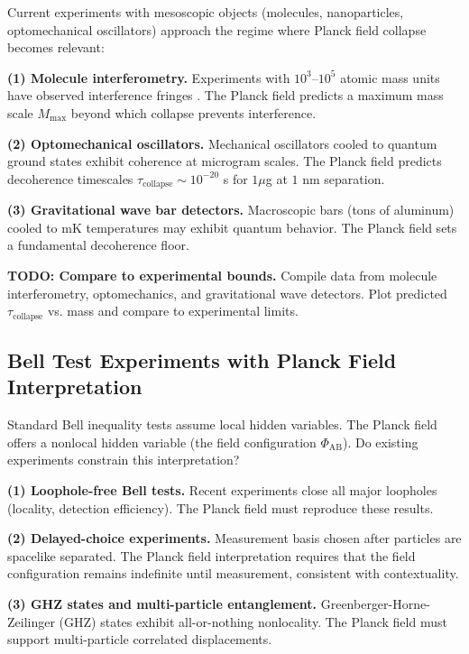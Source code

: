 \documentclass[11pt,a4paper]{article}
\theoremstyle{definition}
\theoremstyle{remark}
\begin{document}
Current experiments with mesoscopic objects (molecules, nanoparticles, optomechanical oscillators) approach the regime where Planck field collapse becomes relevant:

\textbf{(1) Molecule interferometry.} Experiments with $10^3$--$10^5$ atomic mass units have observed interference fringes \cite{Arndt2014}. The Planck field predicts a maximum mass scale $M_{\max}$ beyond which collapse prevents interference.

\textbf{(2) Optomechanical oscillators.} Mechanical oscillators cooled to quantum ground states exhibit coherence at microgram scales. The Planck field predicts decoherence timescales $\tau_{\mathrm{collapse}} \sim 10^{-20}$ s for $1 \mu$g at $1$ nm separation.

\textbf{(3) Gravitational wave bar detectors.} Macroscopic bars (tons of aluminum) cooled to mK temperatures may exhibit quantum behavior. The Planck field sets a fundamental decoherence floor.

\textbf{TODO: Compare to experimental bounds.} Compile data from molecule interferometry, optomechanics, and gravitational wave detectors. Plot predicted $\tau_{\mathrm{collapse}}$ vs. mass and compare to experimental limits.

\subsection{Bell Test Experiments with Planck Field Interpretation}
\label{sec:bell_test_planck}

Standard Bell inequality tests assume local hidden variables. The Planck field offers a nonlocal hidden variable (the field configuration $\Phi_{\mathrm{AB}}$). Do existing experiments constrain this interpretation?

\textbf{(1) Loophole-free Bell tests.} Recent experiments \cite{Hensen2015,Giustina2015,Shalm2015} close all major loopholes (locality, detection efficiency). The Planck field must reproduce these results.

\textbf{(2) Delayed-choice experiments.} Measurement basis chosen after particles are spacelike separated. The Planck field interpretation requires that the field configuration remains indefinite until measurement, consistent with contextuality.

\textbf{(3) GHZ states and multi-particle entanglement.} Greenberger-Horne-Zeilinger (GHZ) states exhibit all-or-nothing nonlocality. The Planck field must support multi-particle correlated displacements.
\end{document}
